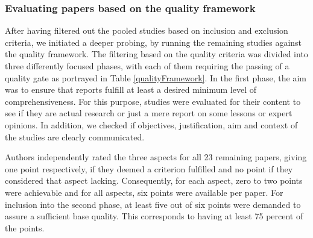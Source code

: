 \documentclass{bmcart}
\begin{document}




\subsubsection{Evaluating papers based on the quality framework}

After having filtered out the pooled studies based on inclusion and exclusion criteria, we initiated a deeper probing, by running the remaining studies against the quality framework. The filtering based on the quality criteria was divided into three differently focused phases, with each of them requiring the passing of a quality gate as portrayed in Table \ref{qualityFramework}. In the first phase, the aim was to ensure that reports fulfill at least a desired minimum level of comprehensiveness. For this purpose, studies were evaluated for their content to see if they are actual research or just a mere report on some lessons or expert opinions. In addition, we checked if objectives, justification, aim and context of the studies are clearly communicated.



Authors independently rated the three aspects for all 23 remaining papers, giving one point respectively, if they deemed a criterion fulfilled and no point if they considered that aspect lacking. Consequently, for each aspect, zero to two points were achievable and for all aspects, six points were available per paper. For inclusion into the second phase, at least five out of six points were demanded to assure a sufficient base quality. This corresponds to having at least 75 percent of the points. 
\end{document}
